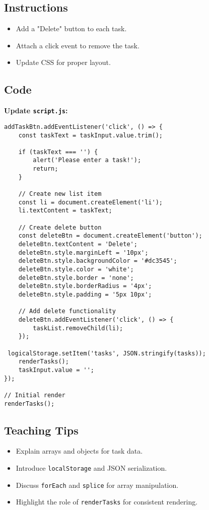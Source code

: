 \documentclass[a4paper,12pt]{article}
\begin{document}
\subsection{Instructions}
\begin{itemize}
    \item Add a "Delete" button to each task.
    \item Attach a click event to remove the task.
    \item Update CSS for proper layout.
\end{itemize}

\subsection{Code}
\textbf{Update \texttt{script.js}:}
\lstset{language=JavaScript}
\begin{lstlisting}
addTaskBtn.addEventListener('click', () => {
    const taskText = taskInput.value.trim();
    
    if (taskText === '') {
        alert('Please enter a task!');
        return;
    }
    
    // Create new list item
    const li = document.createElement('li');
    li.textContent = taskText;
    
    // Create delete button
    const deleteBtn = document.createElement('button');
    deleteBtn.textContent = 'Delete';
    deleteBtn.style.marginLeft = '10px';
    deleteBtn.style.backgroundColor = '#dc3545';
    deleteBtn.style.color = 'white';
    deleteBtn.style.border = 'none';
    deleteBtn.style.borderRadius = '4px';
    deleteBtn.style.padding = '5px 10px';
    
    // Add delete functionality
    deleteBtn.addEventListener('click', () => {
        taskList.removeChild(li);
    });
    
 logicalStorage.setItem('tasks', JSON.stringify(tasks));
    renderTasks();
    taskInput.value = '';
});

// Initial render
renderTasks();
\end{lstlisting}

\subsection{Teaching Tips}
\begin{itemize}
    \item Explain arrays and objects for task data.
    \item Introduce \texttt{localStorage} and JSON serialization.
    \item Discuss \texttt{forEach} and \texttt{splice} for array manipulation.
    \item Highlight the role of \texttt{renderTasks} for consistent rendering.
\end{itemize}
\end{document}
